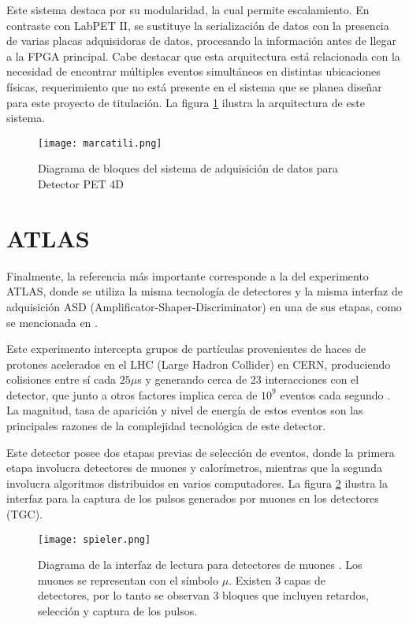 	Este sistema destaca por su modularidad, la cual permite escalamiento. En contraste con LabPET II, se sustituye la serialización de datos con la presencia de varias placas adquisidoras de datos, procesando la información antes de llegar a la FPGA principal. Cabe destacar que esta arquitectura está relacionada con la necesidad de encontrar múltiples eventos simultáneos en distintas ubicaciones físicas, requerimiento que no está presente en el sistema que se planea diseñar para este proyecto de titulación. La figura \ref{fig:marcatili} ilustra la arquitectura de este sistema.
	
	\begin{figure}[h]
		\centering
		\texttt{[image: marcatili.png]}
		\caption{Diagrama de bloques del sistema de adquisición de datos para Detector PET 4D \cite{Marcatili2011DevelopmentDetector}}
		\label{fig:marcatili}
	\end{figure}
	
\newpage
\section{ATLAS}
	
	Finalmente, la referencia más importante corresponde a la del experimento ATLAS, donde se utiliza la misma tecnología de detectores y la misma interfaz de adquisición ASD (Amplificator-Shaper-Discriminator) en una de sus etapas, como se mencionada en \cite{Spieler2012ElectronicsAcquisition}.
	
	Este experimento intercepta grupos de partículas provenientes de haces de protones acelerados en el LHC (Large Hadron Collider) en CERN, produciendo colisiones entre sí cada $25\mu$s y generando cerca de 23 interacciones con el detector, que junto a otros factores implica cerca de $10^9$ eventos cada segundo \cite{Whiteson2016TheSystem}. La magnitud, tasa de aparición y nivel de energía de estos eventos son las principales razones de la complejidad tecnológica de este detector.
	
	Este detector posee dos etapas previas de selección de eventos, donde la primera etapa involucra detectores de muones y calorímetros, mientras que la segunda involucra algoritmos distribuidos en varios computadores. La figura \ref{fig:spieler} ilustra la interfaz para la captura de los pulsos generados por muones en los detectores (TGC).
	
	
	\begin{figure}[h]
		\centering
		\texttt{[image: spieler.png]}
		\caption{Diagrama de la interfaz de lectura para detectores de muones \cite{Spieler2012ElectronicsAcquisition}. Los muones se representan con el símbolo $\mu$. Existen 3 capas de detectores, por lo tanto se observan 3 bloques que incluyen retardos, selección y captura de los pulsos.}
		\label{fig:spieler}
	\end{figure}
	
